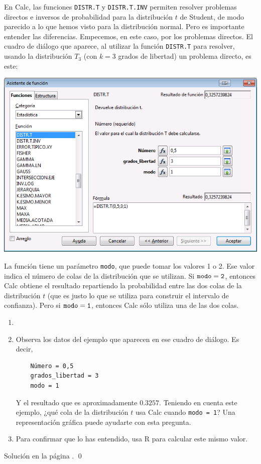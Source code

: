 \documentclass[10pt,a4paper]{article}\usepackage[]{graphicx}\usepackage[]{color}
\begin{document}
En Calc, las funciones {\tt DISTR.T} y {\tt DISTR.T.INV} permiten resolver problemas directos e inversos de probabilidad para la distribución $t$ de Student, de modo parecido a lo que hemos visto para la distribución normal. Pero es importante entender las diferencias. Empecemos, en este caso, por los problemas directos. El cuadro de diálogo que aparece, al utilizar la función {\tt DISTR.T} para resolver, usando la distribución $T_{3}$ (con $k=3$ grados de libertad) un problema directo, es este:
    \begin{center}
    \includegraphics[width=15cm]{../fig/Tut06-13.png}
    \end{center}
La función tiene un parámetro {\tt modo}, que puede tomar los valores 1 o 2. Ese valor indica el número de colas de la distribución que se utilizan. Si ${\tt modo = 2}$, entonces Calc obtiene el resultado repartiendo la probabilidad entre las dos colas de la distribución $t$ (que es justo lo que se utiliza para construir el intervalo de confianza). Pero si ${\tt modo = 1}$, entonces Calc sólo utiliza una de las dos colas.

\begin{ejercicio}
\label{tut06:ejercicio13}
\begin{enumerate}
  \item[]
  \item Observa los datos del ejemplo que aparecen en ese cuadro de diálogo. Es decir,
    \begin{verbatim}
    Número = 0,5
    grados_libertad = 3
    modo = 1
    \end{verbatim}
    Y el resultado que es aproximadamente $0.3257$.  Teniendo en cuenta este ejemplo, ¿qué cola de la distribución $t$ usa Calc cuando {\tt modo = 1}? Una representación gráfica puede ayudarte con esta pregunta.
  \item Para confirmar que lo has entendido, usa R para calcular este mismo valor.
\end{enumerate}
Solución en la página \pageref{tut06:ejercicio13:sol}.
\qed
\end{ejercicio}
\end{document}

